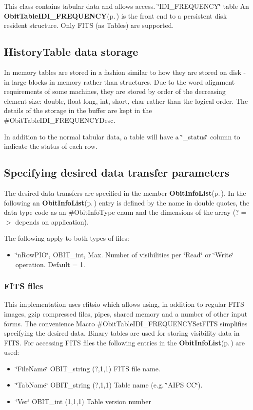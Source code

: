 This class contains tabular data and allows access. \char`\"{}IDI\_\-FREQUENCY\char`\"{} table An {\bf Obit\-Table\-IDI\_\-FREQUENCY}{\rm (p.\,\pageref{structObitTableIDI__FREQUENCY})} is the front end to a persistent disk resident structure. Only FITS (as Tables) are supported.\subsection{History\-Table data storage}\label{ObitTableWX_8h_TableDataStorage}
In memory tables are stored in a fashion similar to how they are stored on disk - in large blocks in memory rather than structures. Due to the word alignment requirements of some machines, they are stored by order of the decreasing element size: double, float long, int, short, char rather than the logical order. The details of the storage in the buffer are kept in the \#Obit\-Table\-IDI\_\-FREQUENCYDesc.

In addition to the normal tabular data, a table will have a \char`\"{}\_\-status\char`\"{} column to indicate the status of each row.\subsection{Specifying desired data transfer parameters}\label{ObitTableIDI__FREQUENCY_8h_ObitTableIDI_FREQUENCYSpecification}
The desired data transfers are specified in the member {\bf Obit\-Info\-List}{\rm (p.\,\pageref{structObitInfoList})}. In the following an {\bf Obit\-Info\-List}{\rm (p.\,\pageref{structObitInfoList})} entry is defined by the name in double quotes, the data type code as an \#Obit\-Info\-Type enum and the dimensions of the array (? =$>$ depends on application).

The following apply to both types of files: \begin{itemize}
\item \char`\"{}n\-Row\-PIO\char`\"{}, OBIT\_\-int, Max. Number of visibilities per \char`\"{}Read\char`\"{} or \char`\"{}Write\char`\"{} operation. Default = 1.\end{itemize}
\subsubsection{FITS files}\label{ObitTableWX_8h_TableFITS}
This implementation uses cfitsio which allows using, in addition to regular FITS images, gzip compressed files, pipes, shared memory and a number of other input forms. The convenience Macro \#Obit\-Table\-IDI\_\-FREQUENCYSet\-FITS simplifies specifying the desired data. Binary tables are used for storing visibility data in FITS. For accessing FITS files the following entries in the {\bf Obit\-Info\-List}{\rm (p.\,\pageref{structObitInfoList})} are used: \begin{itemize}
\item \char`\"{}File\-Name\char`\"{} OBIT\_\-string (?,1,1) FITS file name. \item \char`\"{}Tab\-Name\char`\"{} OBIT\_\-string (?,1,1) Table name (e.g. \char`\"{}AIPS CC\char`\"{}). \item \char`\"{}Ver\char`\"{} OBIT\_\-int (1,1,1) Table version number\end{itemize}
